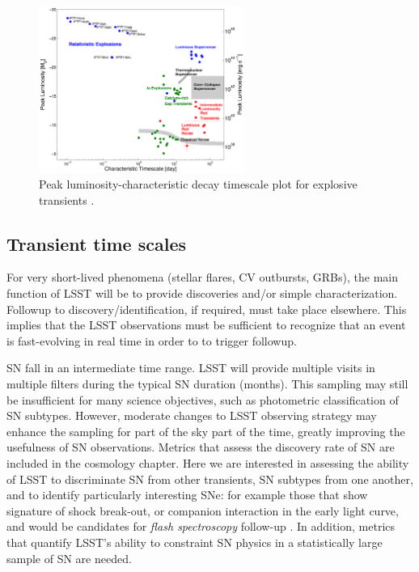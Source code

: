 \begin{figure}[hbt]
\centerline{
\includegraphics[width=0.6\textwidth]{figs/transients/taumv_2014.pdf}
}
\caption{
Peak luminosity-characteristic decay timescale plot for explosive
transients \citep[adapted from][]{2011PhDT........35K}.
}
\label{fig:transient_phase_space}
\end{figure}





%




\subsection{Transient time scales}

For very short-lived phenomena (stellar flares, CV outbursts, GRBs),
the main function of LSST will be to provide discoveries
and/or simple characterization.  Followup to discovery/identification,
if required, must take place elsewhere. This implies that the LSST
observations must be sufficient to recognize that an event is fast-evolving
in real time in order to to trigger followup.

SN fall in an intermediate time range.  LSST will provide
multiple visits in multiple filters during the typical SN duration
(months).  This sampling may still be insufficient for many science
objectives, such as photometric classification of SN subtypes.  
However, moderate changes to LSST
observing strategy may enhance the sampling for part of the sky part
of the time, greatly improving the usefulness of SN observations. 
Metrics that assess the discovery rate of SN are included in the
cosmology chapter. Here we are interested in assessing the ability of
LSST to discriminate SN from other transients, SN subtypes from one
another, and to identify particularly interesting SNe: for example
those that show signature of shock break-out, or companion interaction
in the early light curve, and would be candidates for \emph{flash
spectroscopy} follow-up \citep[e.g.,][]{2014Natur.509..471G}. 
In addition, metrics that
quantify LSST's ability to constraint SN physics in a statistically
large sample of SN are needed.

